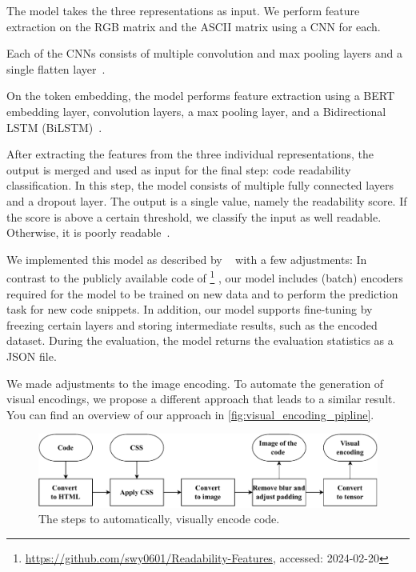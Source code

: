 \documentclass[%
class=scrreprt,
chapterprefix=false,%
open=right,%
twoside=true,%
paper=a4,%
logofile={Logo\_zentral\_farbig\_EN.png},%
thesistype=master,%
UKenglish,%
]{se2thesis}
\newcounter{urlfootnote}
\newcommand{\onecurl}[2]{%
	\stepcounter{urlfootnote}%
	\expandafter\def\csname urlfootnote:#1\endcsname{\theurlfootnote}%
	\footnote{\label{url:#1}\url{#1}, accessed: #2}%
}
\newcommand{\curl}[2]{%
		\onecurl{#1}{#2}%
}
\theoremstyle{definition}
\begin{document}
	The model takes the three representations as input. We perform feature extraction on the RGB matrix and the ASCII matrix using a CNN for each.
	
	Each of the CNNs consists of multiple convolution and max pooling layers and a single flatten layer~\cite{mi2022towards}. 
	
	On the token embedding, the model performs feature extraction using a BERT embedding layer, convolution layers, a max pooling layer, and a Bidirectional LSTM (BiLSTM)~\cite{mi2022towards}.
	
    After extracting the features from the three individual representations, the output is merged and used as input for the final step: code readability classification. In this step, the model consists of multiple fully connected layers and a dropout layer. The output is a single value, namely the readability score. If the score is above a certain threshold, we classify the input as well readable. Otherwise, it is poorly readable~\cite{mi2022towards}.
	
	We implemented this model as described by \citeauthor{mi2022towards}~\cite{mi2022towards} with a few adjustments:
	In contrast to the publicly available code of \citeauthor{mi2022towards}\curl{https://github.com/swy0601/Readability-Features}{2024-02-20}, our model includes (batch) encoders required for the model to be trained on new data and to perform the prediction task for new code snippets. In addition, our model supports fine-tuning by freezing certain layers and storing intermediate results, such as the encoded dataset. During the evaluation, the model returns the evaluation statistics as a JSON file.
	
	We made adjustments to the image encoding. To automate the generation of visual encodings, we propose a different approach that leads to a similar result. You can find an overview of our approach in \autoref{fig:visual_encoding_pipline}.
	
	\begin{figure}
		\centering
		\includegraphics[width=\textwidth]{img/visual_encoding_pipline.pdf}
		\caption{The steps to automatically, visually encode code.}
		\label{fig:visual_encoding_pipline}
	\end{figure}
	
\end{document}
